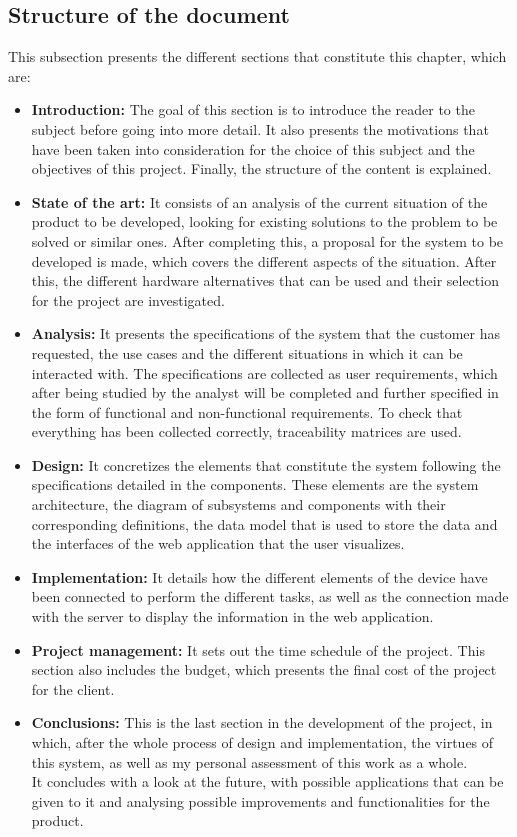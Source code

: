 \subsection{Structure of the document}\label{subsec:structure-of-the-document}
This subsection presents the different sections that constitute this chapter, which are:
\begin{itemize}
	\item \textbf{Introduction:} The goal of this section is to introduce the reader to the subject before going into more detail. It also presents the motivations that have been taken into consideration for the choice of this subject and the objectives of this project. Finally, the structure of the content is explained.
	\item \textbf{State of the art:} It consists of an analysis of the current situation of the product to be developed, looking for existing solutions to the problem to be solved or similar ones. After completing this, a proposal for the system to be developed is made, which covers the different aspects of the situation. After this, the different hardware alternatives that can be used and their selection for the project are investigated.
	\item \textbf{Analysis:} It presents the specifications of the system that the customer has requested, the use cases and the different situations in which it can be interacted with. The specifications are collected as user requirements, which after being studied by the analyst will be completed and further specified in the form of functional and non-functional requirements. To check that everything has been collected correctly, traceability matrices are used.
	\item \textbf{Design:} It concretizes the elements that constitute the system following the specifications detailed in the components. These elements are the system architecture, the diagram of subsystems and components with their corresponding definitions, the data model that is used to store the data and the interfaces of the web application that the user visualizes.
	\item \textbf{Implementation:} It details how the different elements of the device have been connected to perform the different tasks, as well as the connection made with the server to display the information in the web application.
	\item \textbf{Project management:} It sets out the time schedule of the project. This section also includes the budget, which presents the final cost of the project for the client.
	\item \textbf{Conclusions:} This is the last section in the development of the project, in which, after the whole process of design and implementation, the virtues of this system, as well as my personal assessment of this work as a whole. \\ It concludes with a look at the future, with possible applications that can be given to it and analysing possible improvements and functionalities for the product.
\end{itemize}
\pagebreak

